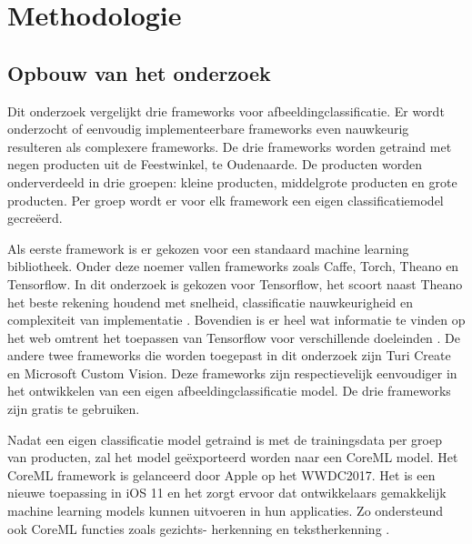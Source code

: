 
\chapter{Methodologie}
\label{ch:methodologie}


\section{Opbouw van het onderzoek}
\label{sec:Opbouw van het onderzoek}

Dit onderzoek vergelijkt drie frameworks voor afbeeldingclassificatie. Er wordt onderzocht of eenvoudig implementeerbare frameworks even nauwkeurig resulteren als complexere frameworks. De drie frameworks worden getraind met negen producten uit de Feestwinkel, te Oudenaarde. De producten worden onderverdeeld in drie groepen: kleine producten, middelgrote producten en grote producten. Per groep wordt er voor elk framework een eigen classificatiemodel gecreëerd.

Als eerste framework is er gekozen voor een standaard machine learning bibliotheek. Onder deze noemer vallen frameworks zoals Caffe, Torch, Theano en Tensorflow. In dit onderzoek is gekozen voor Tensorflow, het scoort naast Theano het beste rekening houdend met snelheid, classificatie nauwkeurigheid en complexiteit van implementatie \autocite{researchgate}. Bovendien is er heel wat informatie te vinden op het web omtrent het toepassen van Tensorflow voor verschillende doeleinden \autocite{huyen}. De andere twee frameworks die worden toegepast in dit onderzoek zijn Turi Create en Microsoft Custom Vision. Deze frameworks zijn respectievelijk eenvoudiger in het ontwikkelen van een eigen afbeeldingclassificatie model. De drie frameworks zijn gratis te gebruiken. 

Nadat een eigen classificatie model getraind is met de trainingsdata per groep van producten, zal het model geëxporteerd worden naar een CoreML model. Het CoreML framework is gelanceerd door Apple op het WWDC2017. Het is een nieuwe toepassing in iOS 11 en het zorgt ervoor dat ontwikkelaars gemakkelijk machine learning models kunnen uitvoeren in hun applicaties. Zo ondersteund ook CoreML functies zoals gezichts- herkenning en tekstherkenning \autocite{coreml}. 

